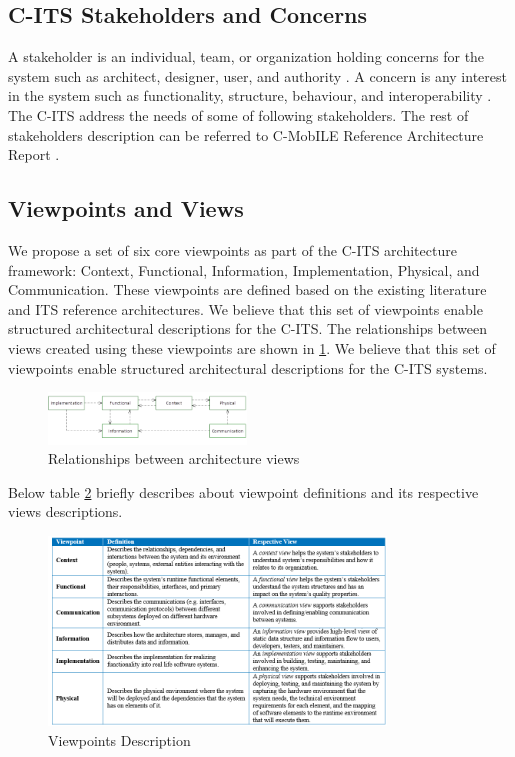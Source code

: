 \documentclass[letterpaper, 10 pt, conference]{ieeeconf}  %
\begin{document}
\subsection{C-ITS Stakeholders and Concerns}

A stakeholder is an individual, team, or organization holding concerns for the system such as architect, designer, user, and authority \cite{iso42010}. A concern is any interest in the system such as functionality, structure, behaviour, and interoperability \cite{iso42010}. The C-ITS address the needs of some of following stakeholders. The rest of stakeholders description can be referred to C-MobILE Reference Architecture Report \cite{d31}.



\subsection{Viewpoints and Views}

We propose a set of six core viewpoints as part of the C-ITS architecture framework: Context, Functional, Information, Implementation, Physical, and Communication. These viewpoints are defined based on the existing literature and ITS reference architectures. We believe that this set of viewpoints enable structured architectural descriptions for the C-ITS. The relationships between views created using these viewpoints are shown in \ref{views_rel}. We believe that this set of viewpoints enable structured architectural descriptions for the C-ITS systems.

\begin{figure}[ht!]
	\centering
	\includegraphics[width=0.47\textwidth]{views_rel}
	\caption{Relationships between architecture views}
	\label{views_rel}
	\centering
\end{figure}

Below table \ref{viewpoint_desc} briefly describes about viewpoint definitions and its respective views descriptions.

\begin{figure}[t!]
	\centering
	\includegraphics[width=0.80\textwidth]{viewpoint_desc}
	\caption{Viewpoints Description}
	\label{viewpoint_desc}
	\centering
\end{figure}
\end{document}
